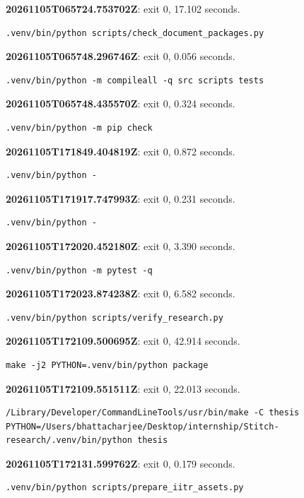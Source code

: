 \noindent\textbf{20261105T065724.753702Z}: exit 0, 17.102 seconds.
\begin{lstlisting}[numbers=none]
.venv/bin/python scripts/check_document_packages.py
\end{lstlisting}

\noindent\textbf{20261105T065748.296746Z}: exit 0, 0.056 seconds.
\begin{lstlisting}[numbers=none]
.venv/bin/python -m compileall -q src scripts tests
\end{lstlisting}

\noindent\textbf{20261105T065748.435570Z}: exit 0, 0.324 seconds.
\begin{lstlisting}[numbers=none]
.venv/bin/python -m pip check
\end{lstlisting}

\noindent\textbf{20261105T171849.404819Z}: exit 0, 0.872 seconds.
\begin{lstlisting}[numbers=none]
.venv/bin/python -
\end{lstlisting}

\noindent\textbf{20261105T171917.747993Z}: exit 0, 0.231 seconds.
\begin{lstlisting}[numbers=none]
.venv/bin/python -
\end{lstlisting}

\noindent\textbf{20261105T172020.452180Z}: exit 0, 3.390 seconds.
\begin{lstlisting}[numbers=none]
.venv/bin/python -m pytest -q
\end{lstlisting}

\noindent\textbf{20261105T172023.874238Z}: exit 0, 6.582 seconds.
\begin{lstlisting}[numbers=none]
.venv/bin/python scripts/verify_research.py
\end{lstlisting}

\noindent\textbf{20261105T172109.500695Z}: exit 0, 42.914 seconds.
\begin{lstlisting}[numbers=none]
make -j2 PYTHON=.venv/bin/python package
\end{lstlisting}

\noindent\textbf{20261105T172109.551511Z}: exit 0, 22.013 seconds.
\begin{lstlisting}[numbers=none]
/Library/Developer/CommandLineTools/usr/bin/make -C thesis PYTHON=/Users/bhattacharjee/Desktop/internship/Stitch-research/.venv/bin/python thesis
\end{lstlisting}

\noindent\textbf{20261105T172131.599762Z}: exit 0, 0.179 seconds.
\begin{lstlisting}[numbers=none]
.venv/bin/python scripts/prepare_iitr_assets.py
\end{lstlisting}

